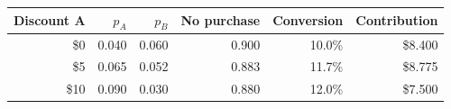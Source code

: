 \begin{tabular}{rrrrrr}
\toprule
Discount A & $p_A$ & $p_B$ & No purchase & Conversion & Contribution \\
\midrule
\$0 & 0.040 & 0.060 & 0.900 & 10.0\% & \$8.400 \\
\$5 & 0.065 & 0.052 & 0.883 & 11.7\% & \$8.775 \\
\$10 & 0.090 & 0.030 & 0.880 & 12.0\% & \$7.500 \\
\bottomrule
\end{tabular}
